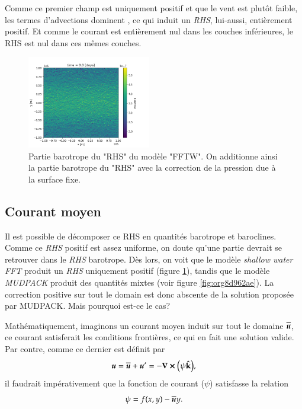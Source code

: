 \documentclass[10pt]{article}
\numberwithin{equation}{section}
\newcommand{\kvf}{\vb{\hat{k}}}
\newcommand{\uu}{\vb*{u}}
\begin{document}
Comme ce premier champ est uniquement positif et que le vent est plutôt faible, les termes d'advections dominent , ce qui induit un \emph{RHS}, lui-aussi, entièrement positif.
Et comme le courant est entièrement nul dans les couches inférieures, le RHS est nul dans ces mêmes couches. \bigskip

\begin{figure} \vspace{-\baselineskip} \centering
\centering
\includegraphics[width=0.48\textwidth]{figures/debuggage/2023_06_12_RHSuBTfftw.png}
\caption{\label{fig:orge73e4f9}Partie barotrope du "RHS" du modèle "FFTW". On additionne ainsi la partie barotrope du "RHS" avec la correction de la pression due à la surface fixe.}
\end{figure}

\subsection{Courant moyen}
\label{sec:org865ccf9}

Il est possible de décomposer ce RHS en quantités barotrope et baroclines.
Comme ce \emph{RHS} positif est assez uniforme, on doute qu'une partie devrait se retrouver dans le \emph{RHS} barotrope.
Dès lors, on voit que le modèle \emph{shallow water FFT} produit un \emph{RHS} uniquement positif (figure \ref{fig:orge73e4f9}), tandis que le modèle \emph{MUDPACK} produit des quantités mixtes (voir figure \ref{fig:org8d962ae}).
La correction positive sur tout le domain est donc abscente de la solution proposée par MUDPACK.
Mais pourquoi est-ce le cas?\bigskip

Mathématiquement, imaginons un courant moyen induit sur tout le domaine \(\overline{\uu}\), ce courant satisferait les conditions frontières, ce qui en fait une solution valide.
Par contre, comme ce dernier est définit par
\begin{equation}
   \uu = \overline{\uu} + \uu' = - \curl(\psi\kvf),
\end{equation}
il faudrait impérativement que la fonction de courant (\(\psi\)) satisfasse la relation
\begin{equation}
\label{eq:orgca2f2fc}
   \psi = f(x,y) - \overline{\uu} y.
\end{equation}
\end{document}
